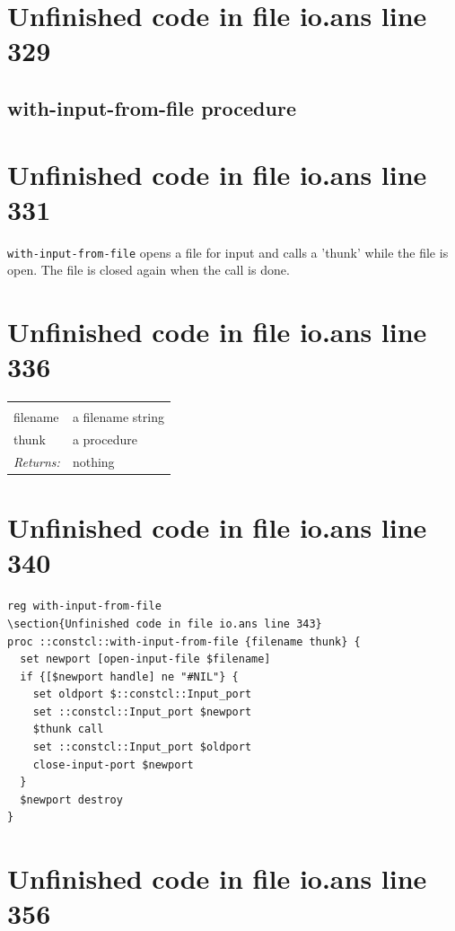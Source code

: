\documentclass[twoside,9pt]{report}
\begin{document}
\section{Unfinished code in file io.ans line 329}
\subsection{with-input-from-file procedure}
\label{with-input-from-file-procedure}
\section{Unfinished code in file io.ans line 331}


\texttt{with-input-from-file} opens a file for input and calls a 'thunk' while the file is open. The file is closed again when the call is done.

\section{Unfinished code in file io.ans line 336}
\noindent\begin{tabular}{ |p{1.9cm} p{8cm}| }
\hline
\rowcolor[HTML]{CCCCCC} \multicolumn{2}{|l|}{\bf with-input-from-file (public)} \\
filename & a filename string \\
thunk & a procedure \\
\textit{Returns:} & nothing \\
\hline
\end{tabular}
\section{Unfinished code in file io.ans line 340}
\begin{lstlisting}
reg with-input-from-file
\section{Unfinished code in file io.ans line 343}
proc ::constcl::with-input-from-file {filename thunk} {
  set newport [open-input-file $filename]
  if {[$newport handle] ne "#NIL"} {
    set oldport $::constcl::Input_port
    set ::constcl::Input_port $newport
    $thunk call
    set ::constcl::Input_port $oldport
    close-input-port $newport
  }
  $newport destroy
}
\end{lstlisting}
\section{Unfinished code in file io.ans line 356}
\end{document}
